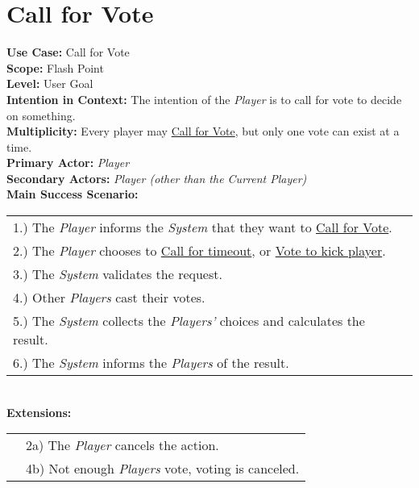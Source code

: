 \documentclass{article}
\begin{document}
	\section*{Call for Vote}
	\textbf{Use Case:} Call for Vote\\
	\textbf{Scope:} Flash Point\\
	\textbf{Level:} User Goal\\
	\textbf{Intention in Context:} The intention of the \textit{Player} is to call for vote to decide on something.\\
	\textbf{Multiplicity: } Every player may \underline{Call for Vote}, but only one vote can exist at a time.\\
	\textbf{Primary Actor:} \textit{Player}\\
	\textbf{Secondary Actors:} \textit{Player (other than the Current Player)}\\
	\textbf{Main Success Scenario:}\\
	\begin{tabular}{l l}
		1.) The \textit{Player} informs the \textit{System} that they want to \underline{Call for Vote}.\\
		2.) The \textit{Player} chooses to \underline{Call for timeout}, or \underline{Vote to kick player}.\\
		3.) The \textit{System} validates the request.\\
		4.) Other \textit{Players} cast their votes.\\
		5.) The \textit{System} collects the \textit{Players'} choices and calculates the result.\\
		6.) The \textit{System} informs the \textit{Players} of the result.
	\end{tabular}\\
	\textbf{Extensions:}\\
	\begin{tabular}{l l}
		&2a) The \textit{Player} cancels the action.\\
		&4b) Not enough \textit{Players} vote, voting is canceled.
	\end{tabular}
\end{document}

